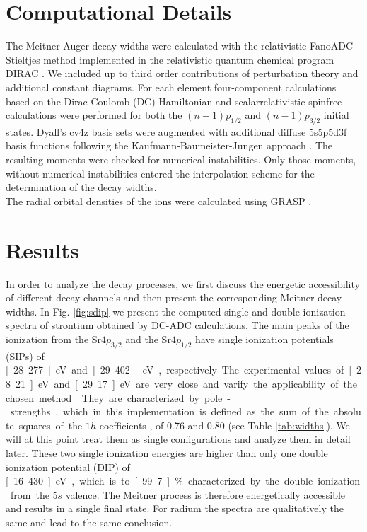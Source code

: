 \documentclass[aps,amssymb,preprint,a4paper]{revtex4}
\begin{document}
%
\section{Computational Details}
\label{section:computational}
The Meitner-Auger
decay widths were calculated with the relativistic FanoADC-Stieltjes
method
implemented in the relativistic quantum chemical program DIRAC \cite{DIRAC17}.
We included up to third order contributions of perturbation theory and additional
constant diagrams.
For each element four-component calculations based on the
Dirac-Coulomb (DC) Hamiltonian
and scalarrelativistic spinfree calculations were
performed for both the $(n-1)p_{1/2}$ and $(n-1)p_{3/2}$ initial states.
Dyall's cv4z basis sets \cite{Dyall4s-7s09} were augmented with additional diffuse
5s5p5d3f
basis functions following the Kaufmann-Baumeister-Jungen approach
\cite{Kaufmann89}.
The resulting moments were checked for numerical instabilities.
Only those moments, without numerical instabilities entered the interpolation
scheme for the determination of the decay widths.\\
The radial orbital densities of the ions were calculated using GRASP
\cite{Dyall89,Parpia96}.

%
\section{Results}
\label{section:results}

In order to analyze the decay processes, we first discuss the energetic
accessibility of different decay channels and then present the corresponding
Meitner decay widths.
In Fig. \ref{fig:sdip} we present the computed
single and double ionization spectra
of strontium obtained by DC-ADC calculations. The main peaks of the
ionization
from the Sr$4p_{3/2}$ and the Sr$4p_{1/2}$ have single ionization potentials (SIPs)
of \unit[28.277]{eV} and \unit[29.402]{eV}, respectively. The experimental
values of \unit[28.21]{eV} and \unit[29.17]{eV} are very close and
varify the applicability
of the chosen method \cite{Schmitz76}.
They are characterized by pole-strengths, which in this implementation
is defined as
the sum of the absolute squares of the $1h$ coefficients
\cite{Trofimov05}, of 0.76 and 0.80
(see Table \ref{tab:widths}). We will at this point treat them as single
configurations and analyze them in detail later.
These two single ionization energies are higher
than only one double ionization potential (DIP) of \unit[16.430]{eV},
which is to \unit[99.7]{\%} characterized by the double ionization from
the $5s$ valence. The Meitner process is therefore energetically accessible and
results in a single final state.
For radium the spectra are qualitatively the same and
lead to the same conclusion.
\end{document}
